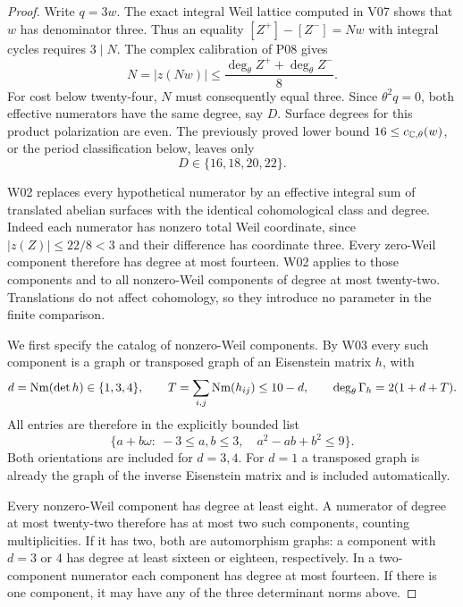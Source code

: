 \begin{proof}
Write $q=3w$. The exact integral Weil lattice computed in V07 shows that $w$ has denominator three. Thus an equality $[Z^+]-[Z^-]=Nw$ with integral cycles requires $3\mid N$. The complex calibration of P08 gives
\[
N=|z(Nw)|\leq \frac{\deg_\theta Z^++\deg_\theta Z^-}{8}.
\]
For cost below twenty-four, $N$ must consequently equal three. Since $\theta^2q=0$, both effective numerators have the same degree, say $D$. Surface degrees for this product polarization are even. The previously proved lower bound $16\leq c_{\mathbb C,\theta}(w)$, or the period classification below, leaves only
\[
D\in\{16,18,20,22\}.
\]

W02 replaces every hypothetical numerator by an effective integral sum of translated abelian surfaces with the identical cohomological class and degree. Indeed each numerator has nonzero total Weil coordinate, since $|z(Z)|\leq22/8<3$ and their difference has coordinate three. Every zero-Weil component therefore has degree at most fourteen. W02 applies to those components and to all nonzero-Weil components of degree at most twenty-two. Translations do not affect cohomology, so they introduce no parameter in the finite comparison.

We first specify the catalog of nonzero-Weil components. By W03 every such component is a graph or transposed graph of an Eisenstein matrix $h$, with
\[
d=\operatorname{Nm}(\det h)\in\{1,3,4\},\qquad
T=\sum_{i,j}\operatorname{Nm}(h_{ij})\leq10-d,\qquad
\deg_\theta\Gamma_h=2(1+d+T).
\]
All entries are therefore in the explicitly bounded list
\[
\{a+b\omega:\ -3\leq a,b\leq3,\quad a^2-ab+b^2\leq9\}.
\]
Both orientations are included for $d=3,4$. For $d=1$ a transposed graph is already the graph of the inverse Eisenstein matrix and is included automatically.

Every nonzero-Weil component has degree at least eight. A numerator of degree at most twenty-two therefore has at most two such components, counting multiplicities. If it has two, both are automorphism graphs: a component with $d=3$ or $4$ has degree at least sixteen or eighteen, respectively. In a two-component numerator each component has degree at most fourteen. If there is one component, it may have any of the three determinant norms above.


\end{proof}
